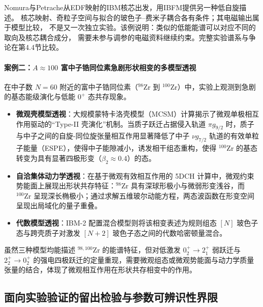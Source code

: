 Nomura与Petrache从EDF映射的IBM核芯出发，用IBFM提供另一种低自旋描述。
核芯映射、奇粒子空间与拟合的玻色子--费米子耦合各有条件；其电磁输出属于模型比较，
不是又一次独立实验。该例说明：类似的低能能谱可以对应不同的取向及核芯耦合成分，
需要未参与调参的电磁资料继续约束。完整实验谱系与争论在第4.4节比较。\cite{nomura-2022-questioning-wobbling-ibfm}

\paragraph{案例二：$A \approx 100$ 富中子锆同位素急剧形状相变的多模型透视}
在中子数 $N=60$ 附近的富中子锆同位素（$^{98}\mathrm{Zr}$ 到 $^{100}\mathrm{Zr}$）中，实验上观测到急剧的基态能级演化与低能 $0^+$ 态共存现象。\cite{doctoral-r1-g28-otsuka-2023-type-ii-shell-evolution,doctoral-r1-g28-togashi-2016-zr-mcsm-qpt,heyde-wood-2011-shape-coexistence-review}
\begin{itemize}
\item \textbf{微观壳模型透视}：大规模蒙特卡洛壳模型（MCSM）计算揭示了微观单极相互作用驱动的“Type-II 壳演化”机制。当质子跃迁占据侵入轨道 $\pi g_{9/2}$ 时，质子与中子之间的自旋-同位旋张量相互作用显著降低了中子 $\nu g_{7/2}$ 轨道的有效单粒子能量（ESPE），使得中子能隙减小，诱发相干组态重构，使得 $^{100}\mathrm{Zr}$ 的基态转变为具有显著四极形变（$\beta_2 \approx 0.4$）的态。\cite{doctoral-r1-g28-otsuka-2023-type-ii-shell-evolution,doctoral-r1-g28-togashi-2016-zr-mcsm-qpt}
\item \textbf{自洽集体动力学透视}：在基于微观有效相互作用的 5DCH 计算中，微观约束势能面上展现出形状共存特征：$^{98}\mathrm{Zr}$ 具有深球形极小与微弱形变浅谷，而 $^{100}\mathrm{Zr}$ 呈现深长椭极小；通过求解五维玻尔动能方程，两态波函数在形变空间呈现出局域化的量子重叠。\cite{prochniak-rohozinski-2009-bohr-collective-hamiltonian}
\item \textbf{代数模型透视}：IBM-2 配置混合模型则将该相变表述为规则组态 $[N]$ 玻色子态与跨壳质子对激发 $[N+2]$ 玻色子态之间的代数哈密顿量混合。\cite{heyde-wood-2011-shape-coexistence-review}
\end{itemize}
虽然三种模型均能描述 $^{98,100}\mathrm{Zr}$ 的能谱特征，但对低激发 $0_2^+ \to 2_1^+$ 弱跃迁与 $2_2^+ \to 0_2^+$ 的强电四极跃迁的定量重现，需要微观组态或微观势能面与动力学质量张量的结合，体现了微观相互作用在形状共存相变中的作用。

\subsection{面向实验验证的留出检验与参数可辨识性界限}\label{sec:2-8-6}

